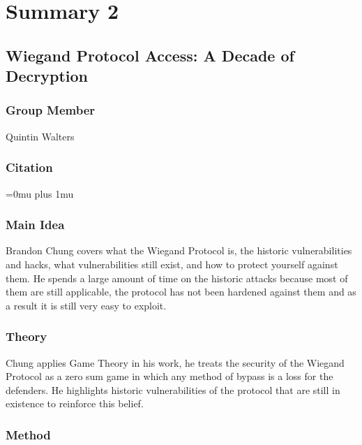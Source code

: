 \section{Summary 2}

\noindent
\subsection{Wiegand Protocol Access: A Decade of Decryption}

\subsubsection{Group Member}

\noindent
Quintin Walters

\noindent
\subsubsection{Citation}

\Urlmuskip=0mu plus 1mu\relax

\subsubsection{Main Idea}

\noindent
Brandon Chung covers what the Wiegand Protocol is, the historic vulnerabilities and hacks, what vulnerabilities still exist, and how to protect yourself against them.  He spends a large amount of time on the historic attacks because most of them are still applicable, the protocol has not been hardened against them and as a result it is still very easy to exploit.

\subsubsection{Theory}

\noindent
Chung applies Game Theory in his work, he treats the security of the Wiegand Protocol as a zero sum game in which any method of bypass is a loss for the defenders.  He highlights historic vulnerabilities of the protocol that are still in existence to reinforce this belief.

\subsubsection{Method}

